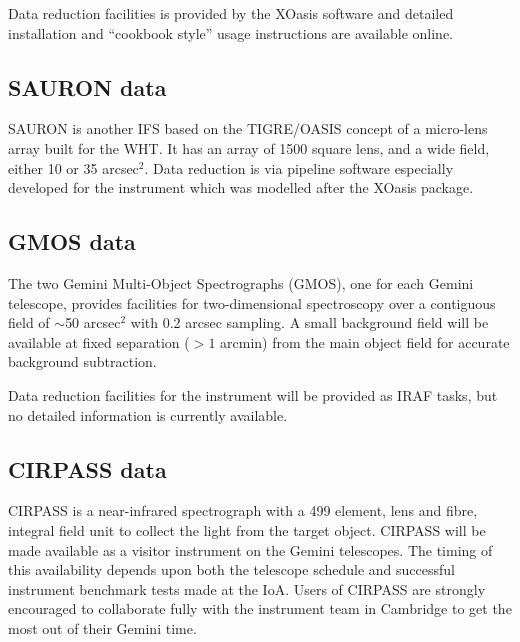 \documentclass[twoside,11pt]{article}
\newcommand{\htmladdnormallink}[2]{#1}
\newcommand{\htmlref}[2]{#1}
\newcommand{\xlabel}[1]{}
\begin{document}
Data reduction facilities is provided by the \htmladdnormallink{XOasis software}{http://www.cfht.hawaii.edu/Instruments/Spectroscopy/OASIS/Reduc/} and detailed installation and ``cookbook style'' usage instructions are available online.

\subsection{\xlabel{sc16_sauron}SAURON data\label{sc16_sauron}}

\htmladdnormallink{SAURON}{http://www-obs.univ-lyon1.fr/~ycopin/sauron.html} is another IFS based on the TIGRE/\htmlref{OASIS}{sc16_oasis} concept of a micro-lens array built for the WHT. It has an array of 1500 square lens, and a wide field, either 10 or 35 arcsec$^2$. Data reduction is via pipeline software especially developed for the instrument which was modelled after the \htmladdnormallink{XOasis}{http://www.cfht.hawaii.edu/Instruments/Spectroscopy/OASIS/Reduc/} package.

\subsection{\xlabel{sc16_gmos}GMOS data\label{sc16_gmos}}

The two Gemini Multi-Object Spectrographs (\htmladdnormallink{GMOS}{http://www.ast.cam.ac.uk/sciops/instruments/gmos/gmosIndex.html}), one for each Gemini telescope, provides facilities for two-dimensional spectroscopy over a contiguous field of $\sim$50 arcsec$^2$ with 0.2 arcsec sampling. A small background field will be available at fixed separation ($>1$ arcmin) from the main object field for accurate background subtraction. 

Data reduction facilities for the instrument will be provided as IRAF tasks, but no detailed information is currently available.       

\subsection{\xlabel{sc16_cirpass}CIRPASS data\label{sc16_cirpass}}

\htmladdnormallink{CIRPASS}{http://www.ast.cam.ac.uk/~optics/cirpass/} is a near-infrared spectrograph with a 499 element, lens and fibre, integral field unit to collect the light from the target object. CIRPASS will be made available as a visitor instrument on the Gemini telescopes. The timing of this availability depends upon both the telescope schedule and successful instrument benchmark tests made at the IoA. Users of CIRPASS are strongly encouraged to collaborate fully with the instrument team in Cambridge to get the most out of their Gemini time.
\end{document}
